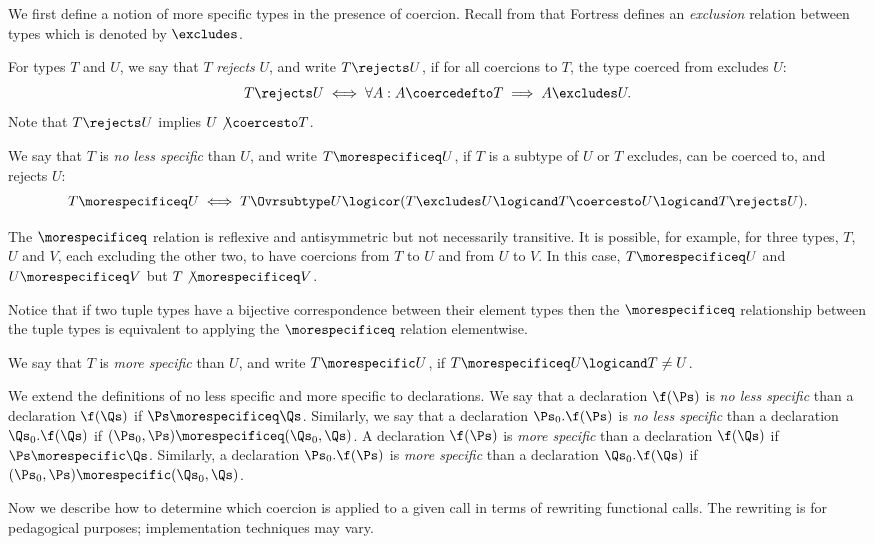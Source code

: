 We first define a notion of more specific types in the presence of coercion.
Recall from  that Fortress defines an
\emph{exclusion} relation between types which is denoted by $\excludes$.

For types $T$ and $U$, we say that $T$ \emph{rejects} $U$,
and write $T \rejects U$, if for all coercions to $T$, the type coerced
from excludes $U$:
\[
T \rejects U \iff \forall A: A \coercedefto T \implies A \excludes U.
\]
Note that $T \rejects U$ implies $U \not\coercesto T$.

We say that $T$ is \emph{no less specific} than $U$, and write $T
\morespecificeq U$, if $T$ is a subtype of $U$ or $T$ excludes, can be
coerced to, and rejects $U$:
\[
T \morespecificeq U \iff
T \Ovrsubtype U \logicor
(T \excludes U \logicand T \coercesto U \logicand T \rejects U).
\]

The $\morespecificeq$ relation is reflexive and antisymmetric but not
necessarily transitive.  It is possible, for example, for
three types, $T$, $U$ and $V$, each excluding the other two,
to have coercions from $T$ to $U$ and from $U$ to $V$.  In
this case, $T \morespecificeq U$ and $U \morespecificeq V$ but
$T \not\morespecificeq V$.

Notice that if two tuple types have a bijective correspondence
between their element types then the $\morespecificeq$ relationship between
the tuple types is equivalent to applying the $\morespecificeq$
relation elementwise.

We say that $T$ is \emph{more specific} than $U$, and write $T
\morespecific U$, if $T \morespecificeq U \logicand T \neq U$.

We extend the definitions of no less specific and more specific to
declarations.  We say that a declaration $\f(\Ps)$ is \emph{no less
specific} than a declaration $\f(\Qs)$ if $\Ps \morespecificeq \Qs$.
Similarly, we say that a declaration $\Ps_0.\f(\Ps)$ is \emph{no less
specific} than a declaration $\Qs_0.\f(\Qs)$ if $(\Ps_0, \Ps)
\morespecificeq (\Qs_0, \Qs)$.  A declaration $\f(\Ps)$ is \emph{more
specific} than a declaration $\f(\Qs)$ if $\Ps \morespecific \Qs$.
Similarly, a declaration $\Ps_0.\f(\Ps)$ is \emph{more specific} than
a declaration $\Qs_0.\f(\Qs)$ if $(\Ps_0, \Ps) \morespecific (\Qs_0,
\Qs)$.

Now we describe how to determine which coercion is applied to a given
call in terms of rewriting functional calls.  The rewriting is
for pedagogical purposes; implementation techniques may vary.

